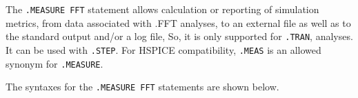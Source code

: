 

The \texttt{.MEASURE FFT} statement allows calculation or reporting of simulation
metrics, from data associated with .FFT analyses, to an external file as well as to
the standard output and/or a log file, So, it is only supported for \texttt{.TRAN},
analyses.  It can be used with {\tt .STEP}.  For HSPICE compatibility, \texttt{.MEAS}
is an allowed synonym for \texttt{.MEASURE}.

The syntaxes for the \texttt{.MEASURE FFT} statements are shown below.

